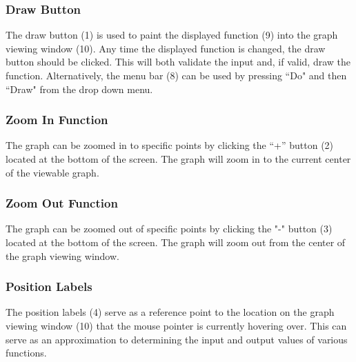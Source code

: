 \documentclass{article}[12 pt]
\begin{document}
			\subsubsection{Draw Button}
			The draw button (1) is used to paint the displayed function (9) into the graph viewing window (10). Any time the displayed function is changed, the draw button should be clicked. This will both validate the input and, if valid, draw the function. Alternatively, the menu bar (8) can be used by pressing ``Do" and then ``Draw" from the drop down menu.
 				
 			\subsubsection{Zoom In Function}
			The graph can be zoomed in to specific points by clicking the ``+'' button (2) located at the bottom of the screen. The graph will zoom in to the current center of the viewable graph. 
			
			\subsubsection{Zoom Out Function}
			The graph can be zoomed out of specific points by clicking the "-" button (3)  located at the bottom of the screen. The graph will zoom out from the center of the graph viewing window.
			
			\subsubsection{Position Labels}
			The position labels (4) serve as a reference point to the location on the graph viewing window (10) that the mouse pointer is currently hovering over. This can serve as an approximation to determining the input and output values of various functions.
 		
\end{document}
